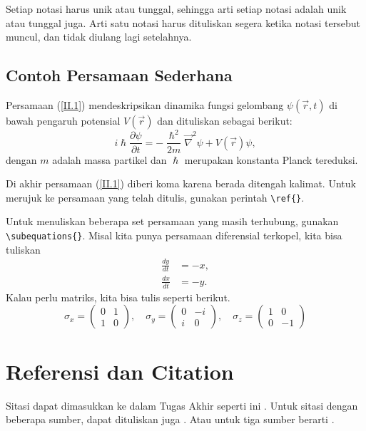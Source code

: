 Setiap notasi harus unik atau tunggal, sehingga arti setiap notasi adalah unik atau tunggal juga. Arti satu notasi harus dituliskan segera ketika notasi tersebut muncul, dan tidak diulang lagi setelahnya.

\subsection{Contoh Persamaan Sederhana}
Persamaan (\ref{II.1}) mendeskripsikan dinamika fungsi gelombang $\psi(\vec{r},t)$ di bawah pengaruh potensial $V(\vec{r})$ dan dituliskan sebagai berikut:
\begin{equation}\label{II.1}
        i\hslash\frac{\partial \psi}{\partial t} = -\frac{\hslash^2}{2 m}\Vec{\nabla}^2 \psi + V(\vec{r})\psi,
\end{equation}
dengan $m$ adalah massa partikel dan $\hslash$ merupakan konstanta Planck tereduksi.

Di akhir persamaan (\ref{II.1}) diberi koma karena berada ditengah kalimat. Untuk merujuk ke persamaan yang telah ditulis, gunakan perintah \verb|\ref{}|.

Untuk menuliskan beberapa set persamaan yang masih terhubung, gunakan \verb|\subequations{}|. Misal kita punya persamaan diferensial terkopel, kita bisa tuliskan
\begin{subequations}
        \begin{align}
                \frac{dy}{dt} & = -x , \\
                \frac{dx}{dt} & = -y .
        \end{align}
\end{subequations}
Kalau perlu matriks, kita bisa tulis seperti berikut.
\begin{equation}
        \sigma_x = \begin{pmatrix}
                0 & 1 \\
                1 & 0
        \end{pmatrix},\quad
        \sigma_y = \begin{pmatrix}
                0 & -i \\
                i & 0
        \end{pmatrix}, \quad
        \sigma_z = \begin{pmatrix}
                1 & 0  \\
                0 & -1
        \end{pmatrix}
\end{equation}


\section{Referensi dan Citation}
\noindent Sitasi dapat dimasukkan ke dalam Tugas Akhir seperti ini \cite{Fujita1996}. Untuk sitasi dengan beberapa sumber, dapat dituliskan juga \cite{hohen1964,Kim2006}. Atau untuk tiga sumber berarti \cite{kongkanand2006,kresse1999,Leibb1993}.
